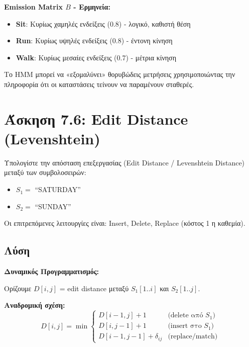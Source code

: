 \textbf{Emission Matrix $B$ - Ερμηνεία:}

\begin{itemize}
    \item \textbf{Sit}: Κυρίως χαμηλές ενδείξεις (0.8) - λογικό, καθιστή θέση
    \item \textbf{Run}: Κυρίως υψηλές ενδείξεις (0.8) - έντονη κίνηση
    \item \textbf{Walk}: Κυρίως μεσαίες ενδείξεις (0.7) - μέτρια κίνηση
\end{itemize}

\begin{infobox}
Το HMM μπορεί να «εξομαλύνει» θορυβώδεις μετρήσεις χρησιμοποιώντας την πληροφορία
ότι οι καταστάσεις τείνουν να παραμένουν σταθερές.
\end{infobox}

\section{Άσκηση 7.6: Edit Distance (Levenshtein)}

\begin{formulabox}[Εκφώνηση]
Υπολογίστε την απόσταση επεξεργασίας (Edit Distance / Levenshtein Distance) μεταξύ
των συμβολοσειρών:
\begin{itemize}
    \item $S_1 = $ ``SATURDAY''
    \item $S_2 = $ ``SUNDAY''
\end{itemize}

Οι επιτρεπόμενες λειτουργίες είναι: Insert, Delete, Replace (κόστος 1 η καθεμία).
\end{formulabox}

\subsection*{Λύση}

\textbf{Δυναμικός Προγραμματισμός:}

Ορίζουμε $D[i,j]$ = edit distance μεταξύ $S_1[1..i]$ και $S_2[1..j]$.

\textbf{Αναδρομική σχέση:}
$$D[i,j] = \min \begin{cases}
D[i-1,j] + 1 & \text{(delete από } S_1\text{)} \\
D[i,j-1] + 1 & \text{(insert στο } S_1\text{)} \\
D[i-1,j-1] + \delta_{ij} & \text{(replace/match)}
\end{cases}$$


